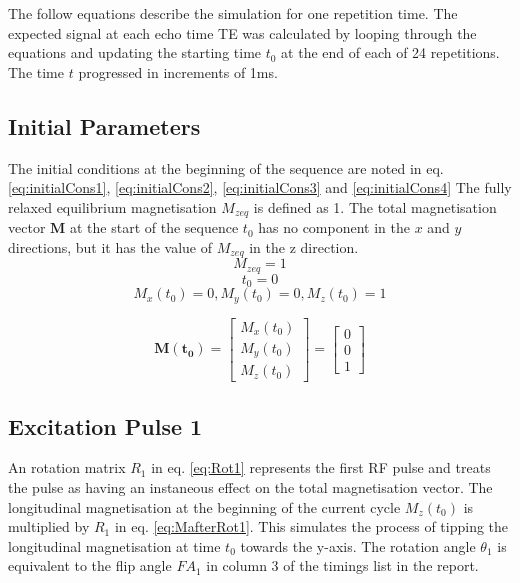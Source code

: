  \label{App:signalSimEquations}

The follow equations describe the simulation for one repetition time. The expected signal at each echo time TE was calculated by looping through the equations and updating the starting time $t_{0}$ at the end of each of 24 repetitions. The time $t$ progressed in increments of 1ms.
\subsection{Initial Parameters}
The initial conditions at the beginning of the sequence are noted in eq. \ref{eq:initialCons1}, \ref{eq:initialCons2}, \ref{eq:initialCons3} and \ref{eq:initialCons4}
The fully relaxed equilibrium magnetisation $M_{zeq} $ is defined as 1. The total magnetisation vector $\boldsymbol{M}$ at the start of the sequence $t_{0}$ has no component in the $x$ and $y$ directions, but it has the value of $M_{zeq} $ in the z direction.
\begin{equation} \label{eq:initialCons1}
M_{zeq} = 1
\end{equation}
\begin{equation} \label{eq:initialCons2}
 t_{0} = 0
\end{equation}
\begin{equation} \label{eq:initialCons3}
M_{x}(t_{0}) = 0, M_{y}(t_{0}) = 0, M_{z}(t_{0}) = 1 
\end{equation}

\begin{equation} \label{eq:initialCons4}
\boldsymbol{M(t_{0})} 
=
\begin{bmatrix}
M_{x}(t_{0}) \\
M_{y}(t_{0}) \\
M_{z}(t_{0})
 \end{bmatrix}
=
\begin{bmatrix}
0 \\
0 \\
1
 \end{bmatrix}
\end{equation}

\subsection{Excitation Pulse 1}
An rotation matrix $R_{1}$ in eq. \ref{eq:Rot1} represents the first RF pulse and treats the pulse as having an instaneous effect on the total magnetisation vector. The longitudinal magnetisation at the beginning of the current cycle $M_{z}(t_{0})$ is multiplied by $R_{1}$ in eq. \ref{eq:MafterRot1}. This simulates the process of tipping the longitudinal magnetisation at time $t_{0}$ towards the y-axis. The rotation angle $\theta_{1}$ is equivalent to the flip angle $FA_{1}$ in column 3 of the timings list in the report.

